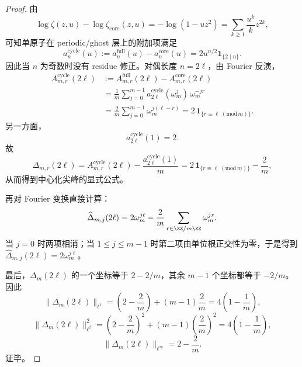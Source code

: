 \begin{proof}
由
\[
\log\zeta(z,u)-\log\zeta_{\mathrm{core}}(z,u)
=
-\log(1-uz^2)
=
\sum_{k\ge 1}\frac{u^k}{k}z^{2k},
\]
可知单原子在 periodic/ghost 层上的附加项满足
\[
a_n^{\mathrm{cycle}}(u)
:=
a_n^{\mathrm{full}}(u)-a_n^{\mathrm{core}}(u)
=
2u^{n/2}\mathbf 1_{\{2\mid n\}}.
\]
因此当 \(n\) 为奇数时没有 residue 修正。对偶长度 \(n=2\ell\)，由 Fourier 反演，
\[
\begin{aligned}
A_{m,r}^{\mathrm{cycle}}(2\ell)
&:=
A_{m,r}^{\mathrm{full}}(2\ell)-A_{m,r}^{\mathrm{core}}(2\ell)\\
&=
\frac1m\sum_{j=0}^{m-1}a_{2\ell}^{\mathrm{cycle}}(\omega_m^j)\,\omega_m^{-jr}\\
&=
\frac{2}{m}\sum_{j=0}^{m-1}\omega_m^{j(\ell-r)}
=
2\,\mathbf 1_{\{r\equiv \ell\;(\mathrm{mod}\,m)\}}.
\end{aligned}
\]
另一方面，
\[
a_{2\ell}^{\mathrm{cycle}}(1)=2.
\]
故
\[
\Delta_{m,r}(2\ell)
=
A_{m,r}^{\mathrm{cycle}}(2\ell)-\frac{a_{2\ell}^{\mathrm{cycle}}(1)}{m}
=
2\,\mathbf 1_{\{r\equiv \ell\;(\mathrm{mod}\,m)\}}-\frac{2}{m},
\]
从而得到中心化尖峰的显式公式。

再对 Fourier 变换直接计算：
\[
\widehat\Delta_{m,j}(2\ell)
=
2\omega_m^{j\ell}-\frac{2}{m}\sum_{r\in\ZZ/m\ZZ}\omega_m^{jr}.
\]
当 \(j=0\) 时两项相消；当 \(1\le j\le m-1\) 时第二项由单位根正交性为零，于是得到
\(
\widehat\Delta_{m,j}(2\ell)=2\omega_m^{j\ell}
\)。

最后，\(\Delta_m(2\ell)\) 的一个坐标等于 \(2-2/m\)，其余 \(m-1\) 个坐标都等于 \(-2/m\)。因此
\[
\|\Delta_m(2\ell)\|_{\ell^1}
=
\left(2-\frac{2}{m}\right)+(m-1)\frac{2}{m}
=
4\left(1-\frac{1}{m}\right),
\]
\[
\|\Delta_m(2\ell)\|_{\ell^2}^2
=
\left(2-\frac{2}{m}\right)^2+(m-1)\left(\frac{2}{m}\right)^2
=
4\left(1-\frac{1}{m}\right),
\]
\[
\|\Delta_m(2\ell)\|_{\ell^\infty}=2-\frac{2}{m}.
\]
证毕。
\end{proof}

